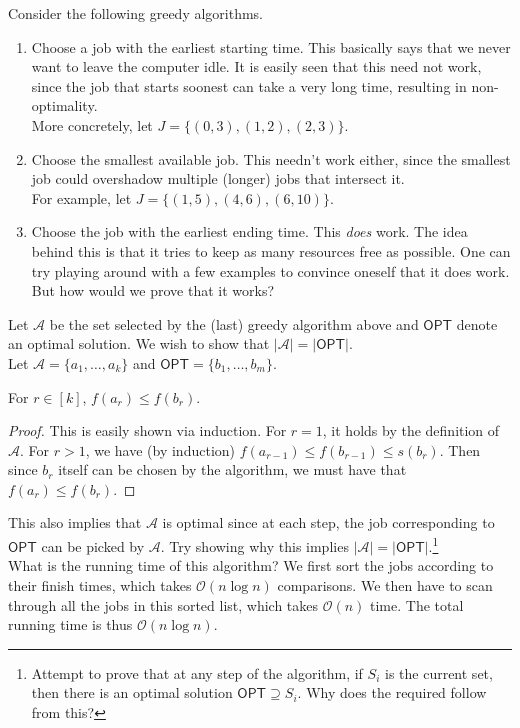 Consider the following greedy algorithms.

\begin{enumerate}
	\item Choose a job with the earliest starting time. This basically says that we never want to leave the computer idle. It is easily seen that this need not work, since the job that starts soonest can take a very long time, resulting in non-optimality.\\
	More concretely, let $J = \{(0,3),(1,2),(2,3)\}$.

	\item Choose the smallest available job. This needn't work either, since the smallest job could overshadow multiple (longer) jobs that intersect it.\\
	For example, let $J=\{(1,5),(4,6),(6,10)\}$.

	\item Choose the job with the earliest ending time. This \textit{does} work. The idea behind this is that it tries to keep as many resources free as possible. One can try playing around with a few examples to convince oneself that it does work.\\
	But how would we prove that it works?
\end{enumerate}

Let $\mathcal{A}$ be the set selected by the (last) greedy algorithm above and $\mathsf{OPT}$ denote an optimal solution. We wish to show that $|\mathcal{A}|=|\mathsf{OPT}|$.\\
Let $\mathcal{A}=\{a_1,\ldots,a_k\}$ and $\mathsf{OPT}=\{b_1,\ldots,b_m\}$.

\begin{lemma}
For $r\in[k]$, $f(a_r) \leq f(b_r)$.
\end{lemma}
\begin{proof}
This is easily shown via induction. For $r=1$, it holds by the definition of $\mathcal{A}$. For $r>1$, we have (by induction) $f(a_{r-1}) \leq f(b_{r-1}) \leq s(b_r)$. Then since $b_r$ itself can be chosen by the algorithm, we must have that $f(a_r) \leq f(b_r)$.
\end{proof}

This also implies that $\mathcal{A}$ is optimal since at each step, the job corresponding to $\mathsf{OPT}$ can be picked by $\mathcal{A}$. Try showing why this implies $|\mathcal{A}|=|\mathsf{OPT}|$.\footnote{Attempt to prove that at any step of the algorithm, if $S_i$ is the current set, then there is an optimal solution $\mathsf{OPT}\supseteq S_i$. Why does the required follow from this?}\\
What is the running time of this algorithm? We first sort the jobs according to their finish times, which takes $\mathcal{O}(n\log n)$ comparisons. We then have to scan through all the jobs in this sorted list, which takes $\mathcal{O}(n)$ time. The total running time is thus $\mathcal{O}(n\log n)$.

